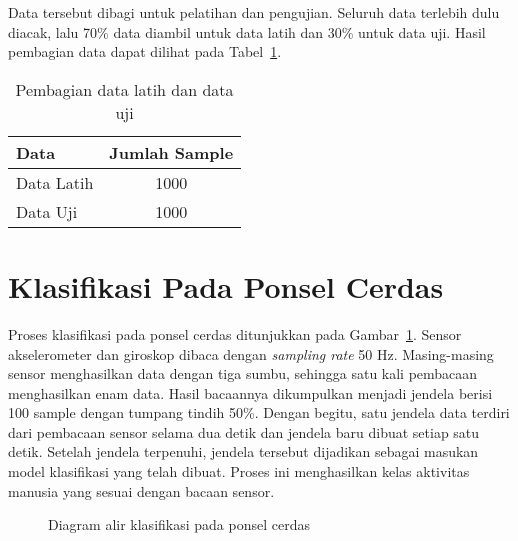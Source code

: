 Data tersebut dibagi untuk pelatihan dan pengujian. Seluruh data terlebih dulu diacak, lalu 70\% data diambil untuk data latih dan 30\% untuk data uji. Hasil pembagian data dapat dilihat pada Tabel~\ref{table:pembagian-data-latih-uji}.

\begin{table}[h!]
    \centering
    \caption{Pembagian data latih dan data uji}
    \begin{tabular}{ |l|c| }
        \hline
        \textbf{Data} & \textbf{Jumlah Sample} \\

        \hline
        Data Latih & 1000 \\

        \hline
        Data Uji & 1000 \\

        \hline
    \end{tabular}
    \label{table:pembagian-data-latih-uji}
\end{table}


\section{Klasifikasi Pada Ponsel Cerdas}
Proses klasifikasi pada ponsel cerdas ditunjukkan pada Gambar~\ref{gambar:diagram-alir-klasifikasi-ponsel-cerdas}. Sensor akselerometer dan giroskop dibaca dengan \textit{sampling rate} 50 Hz. Masing-masing sensor menghasilkan data dengan tiga sumbu, sehingga satu kali pembacaan menghasilkan enam data. Hasil bacaannya dikumpulkan menjadi jendela berisi 100 sample dengan tumpang tindih 50\%. Dengan begitu, satu jendela data terdiri dari pembacaan sensor selama dua detik dan jendela baru dibuat setiap satu detik. Setelah jendela terpenuhi, jendela tersebut dijadikan sebagai masukan model klasifikasi yang telah dibuat. Proses ini menghasilkan kelas aktivitas manusia yang sesuai dengan bacaan sensor.

\begin{figure}
    \centering
    \caption{Diagram alir klasifikasi pada ponsel cerdas}
    \label{gambar:diagram-alir-klasifikasi-ponsel-cerdas}
\end{figure}

